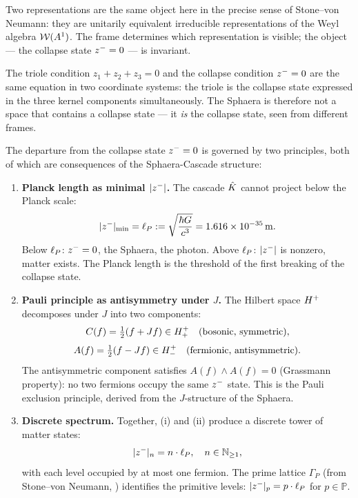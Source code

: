 \begin{remark}
Two representations are the same object here in the precise sense of
Stone--von Neumann: they are unitarily equivalent irreducible
representations of the Weyl algebra $\mathcal{W}(A^1)$.
The frame determines which representation is visible; the object ---
the collapse state $z^-=0$ --- is invariant.

The triole condition $z_1+z_2+z_3=0$ and the collapse condition
$z^-=0$ are the same equation in two coordinate systems: the triole
is the collapse state expressed in the three kernel components
simultaneously.
The Sphaera is therefore not a space that contains a collapse state ---
it \emph{is} the collapse state, seen from different frames.
\end{remark}

\begin{theorem}
\label{thm:origin}
The departure from the collapse state $z^-=0$ is governed by two
principles, both of which are consequences of the Sphaera-Cascade
structure:
\begin{enumerate}[label=(\roman*)]
 \item \textbf{Planck length as minimal $|z^-|$.}
 The cascade $\hat{K}$ cannot project below the Planck scale:
 \[
 |z^-|_{\min} = \ell_P := \sqrt{\frac{\hbar G}{c^3}}
 = 1.616\times10^{-35}\,\mathrm{m}.
 \]
 Below $\ell_P$: $z^-=0$, the Sphaera, the photon.
 Above $\ell_P$: $|z^-|$ is nonzero, matter exists.
 The Planck length is the threshold of the first breaking of the
 collapse state.
 \item \textbf{Pauli principle as antisymmetry under $J$.}
 The Hilbert space $H^+$ decomposes under $J$ into two
 components:
 \[
 C(f) = \tfrac{1}{2}(f+Jf)\in H^+_+
 \quad\text{(bosonic, symmetric)},
 \]
 \[
 A(f) = \tfrac{1}{2}(f-Jf)\in H^+_-
 \quad\text{(fermionic, antisymmetric)}.
 \]
 The antisymmetric component satisfies $A(f)\wedge A(f)=0$
 (Grassmann property): no two fermions occupy the same $z^-$
 state.
 This is the Pauli exclusion principle, derived from the
 $J$-structure of the Sphaera.
 \item \textbf{Discrete spectrum.}
 Together, (i) and (ii) produce a discrete tower of matter states:
 \[
 |z^-|_n = n\cdot\ell_P,\quad n\in\mathbb{N}_{\geq1},
 \]
 with each level occupied by at most one fermion.
 The prime lattice $\Gamma_P$ (from Stone--von Neumann,
 \cite{brendecke2026rh}) identifies the primitive levels:
 $|z^-|_p = p\cdot\ell_P$ for $p\in\mathbb{P}$.
\end{enumerate}
\end{theorem}

